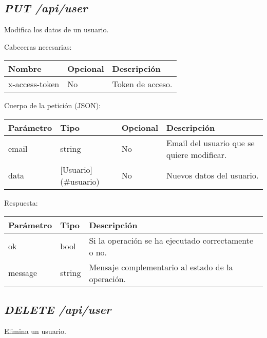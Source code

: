 \subsection{\textit{PUT /api/user}}
Modifica los datos de un usuario.

Cabeceras necesarias:
\begin{table}[h!]
	\centering
	\begin{adjustbox}{max width=\textwidth}
	\begin{tabular}{|l|l|l|}
		\hline
		Nombre & Opcional & Descripción \\ \hline
		x-access-token & No & Token de acceso. \\ \hline
	\end{tabular}
\end{adjustbox}
\end{table}


Cuerpo de la petición (JSON):
\begin{table}[!h]
	\centering
	\begin{adjustbox}{max width=\textwidth}
	\begin{tabular}{|l|l|l|l|}
		\hline
		Parámetro & Tipo & Opcional & Descripción \\ \hline
		email & string & No & Email del usuario que se quiere modificar. \\ \hline
		data & [Usuario](\#usuario) & No & Nuevos datos del usuario. \\ \hline
	\end{tabular}
\end{adjustbox}
\end{table}

Respuesta:
\begin{table}[!h]
	\centering
	\begin{adjustbox}{max width=\textwidth}
	\begin{tabular}{|l|l|l|}
		\hline
		Parámetro & Tipo & Descripción \\ \hline
		ok & bool & Si la operación se ha ejecutado correctamente o no. \\ \hline
		message & string & Mensaje complementario al estado de la operación. \\ \hline
	\end{tabular}
\end{adjustbox}
\end{table}








\subsection{\textit{DELETE /api/user}}
Elimina un usuario.

